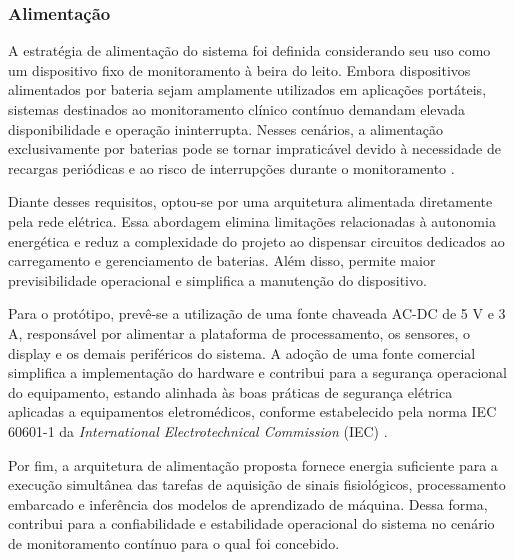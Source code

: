 \subsubsection{Alimentação}




A estratégia de alimentação do sistema foi definida considerando seu uso como um dispositivo fixo de monitoramento à beira do leito. Embora dispositivos alimentados por bateria sejam amplamente utilizados em aplicações portáteis, sistemas destinados ao monitoramento clínico contínuo demandam elevada disponibilidade e operação ininterrupta. Nesses cenários, a alimentação exclusivamente por baterias pode se tornar impraticável devido à necessidade de recargas periódicas e ao risco de interrupções durante o monitoramento \cite{schweber2022}.

Diante desses requisitos, optou-se por uma arquitetura alimentada diretamente pela rede elétrica. Essa abordagem elimina limitações relacionadas à autonomia energética e reduz a complexidade do projeto ao dispensar circuitos dedicados ao carregamento e gerenciamento de baterias. Além disso, permite maior previsibilidade operacional e simplifica a manutenção do dispositivo.

Para o protótipo, prevê-se a utilização de uma fonte chaveada AC-DC de 5 V e 3 A, responsável por alimentar a plataforma de processamento, os sensores, o display e os demais periféricos do sistema. A adoção de uma fonte comercial simplifica a implementação do hardware e contribui para a segurança operacional do equipamento, estando alinhada às boas práticas de segurança elétrica aplicadas a equipamentos eletromédicos, conforme estabelecido pela norma IEC 60601-1 da \textit{International Electrotechnical Commission} (IEC) .

Por fim, a arquitetura de alimentação proposta fornece energia suficiente para a execução simultânea das tarefas de aquisição de sinais fisiológicos, processamento embarcado e inferência dos modelos de aprendizado de máquina. Dessa forma, contribui para a confiabilidade e estabilidade operacional do sistema no cenário de monitoramento contínuo para o qual foi concebido.
